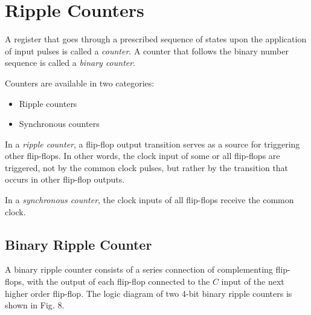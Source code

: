 \section{Ripple Counters}
\label{sec:ripple-counter}

A register that goes through a prescribed sequence of states upon the application of input pulses is called a \textit{counter}. A counter that follows the binary number sequence is called a \textit{binary counter}.

\noindent Counters are available in two categories:
\begin{itemize}
  \item Ripple counters
  \item Synchronous counters
\end{itemize}

In a \textit{ripple counter}, a flip-flop output transition serves as a source for triggering other flip-flops. In other words, the clock input of some or all flip-flops are triggered, not by the common clock pulses, but rather by the transition that occurs in other flip-flop outputs.

In a \textit{synchronous counter}, the clock inputs of all flip-flops receive the common clock.

\subsection{Binary Ripple Counter}
\label{subsec:binary-ripple-counter}

A binary ripple counter consists of a series connection of complementing flip-flops, with the output of each flip-flop connected to the $C$ input of the next higher order flip-flop. The logic diagram of two 4-bit binary ripple counters is shown in Fig. 8.

\vspace*{\fill}
\columnbreak

